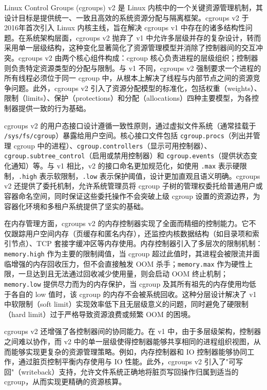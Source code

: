 Linux Control Groups (cgroups) v2 是 Linux 内核中的一个关键资源管理机制，其设计目标是提供统一、一致且高效的系统资源分配与隔离框架。cgroups v2 于2016年首次引入 Linux 内核主线，旨在解决 cgroups v1 中存在的诸多结构性问题。在系统架构层面，cgroups v2 抛弃了 v1 中允许多层级并存的复杂设计，转而采用单一层级结构，这种变化显著简化了资源管理模型并消除了控制器间的交互冲突。cgroups v2 由两个核心组件构成：cgroup 核心负责进程的层级组织；控制器则负责特定资源类型的分配与限制。与 v1 不同，cgroups v2 强制要求一个进程的所有线程必须位于同一 cgroup 中，从根本上解决了线程与内部节点之间的资源竞争问题。此外，cgroups v2 引入了资源分配模型的标准化，包括权重（weights）、限制（limits）、保护（protections）和分配（allocations）四种主要模型，为各控制器提供一致的行为基础。

cgroups v2 的用户态接口设计遵循一致性原则，通过虚拟文件系统（通常挂载于 \texttt{/sys/fs/cgroup}）暴露给用户空间。核心接口文件包括 \texttt{cgroup.procs}（列出并管理 cgroup 中的进程）、\texttt{cgroup.controllers}（显示可用控制器）、\texttt{cgroup.subtree\_control}（启用或禁用控制器）和 \texttt{cgroup.events}（提供状态变化通知）等。与 v1 相比，v2 的接口命名更加规范化，如使用 \texttt{.max} 表示硬限制，\texttt{.high} 表示软限制，\texttt{.low} 表示保护阈值，设计更加直观且语义明确。cgroups v2 还提供了委托机制，允许系统管理员将 cgroup 子树的管理权委托给普通用户或容器命名空间，同时保证这些委托操作不会突破上级 cgroup 设置的资源边界，为容器化环境和多租户系统提供了坚实的基础。

在内存管理方面，cgroups v2 的内存控制器实现了全面而精细的控制能力。它不仅跟踪用户空间内存（页缓存和匿名内存），还监控内核数据结构（如目录项和索引节点）、TCP 套接字缓冲区等内存使用。内存控制器引入了多层次的限制机制：\texttt{memory.high} 作为主要的限制阈值，当 cgroup 超过此值时，其进程会被限流并面临增强的内存回收压力，但不会直接触发 OOM 杀手；\texttt{memory.max} 作为硬性上限，一旦达到且无法通过回收减少使用量，则会启动 OOM 终止机制；\texttt{memory.low} 提供尽力而为的内存保护，当 cgroup 及其所有祖先的内存使用均低于各自的 low 值时，该 cgroup 的内存不会被系统回收。这种分层设计解决了 v1 中软限制（soft limit）实现效率低下且无层级意义的问题，同时避免了硬限制（hard limit）过于严格导致资源浪费或频繁 OOM 的困境。

cgroups v2 还增强了各控制器间的协同能力。在 v1 中，由于多层级架构，控制器之间难以协作，而 v2 中的单一层级使得控制器能够共享相同的进程组织视图，从而能够实现更复杂的资源管理策略。例如，内存控制器和 IO 控制器能够协同工作，通过脏页控制平衡内存使用与 IO 性能。此外，cgroups v2 引入了"可写回"（writeback）支持，允许文件系统正确地将脏页写回操作归属到适当的 cgroup，从而实现更精确的资源核算。

